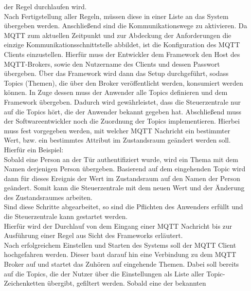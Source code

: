         der Regel durchlaufen wird.
        \\
        Nach Fertigstellung aller Regeln, müssen diese in einer Liste an das System übergeben werden. Anschließend sind die 
        Kommunikationswege zu aktivieren. 
        Da \acs{MQTT} zum aktuellen Zeitpunkt und zur Abdeckung der Anforderungen die einzige Kommunikationsschnittstelle 
        abbildet, ist die Konfiguration des \acs{MQTT} Clients einzustellen. Hierfür muss der Entwickler 
        dem Framework den Host des \acs{MQTT}-Brokers, sowie den Nutzername des Clients und dessen Passwort übergeben. Über das 
        Framework wird dann das Setup durchgeführt, sodass Topics (Themen), die über den Broker veröffentlicht werden, konsumiert 
        werden können. In Zuge dessen muss der Anwender alle Topics definieren und dem Framework übergeben. Dadurch wird gewährleistet, dass 
        die Steuerzentrale nur auf die Topics hört, die der Anwender bekannt gegeben hat. Abschließend muss der Softwareentwickler 
        noch die Zuordnung der Topics implementieren. Hierbei muss fest vorgegeben werden, mit welcher \acs{MQTT} Nachricht ein 
        bestimmter Wert, bzw. ein bestimmtes Attribut im Zustandsraum geändert werden soll. Hierfür ein Beispiel: 
        \\
        Sobald eine Person an der Tür authentifiziert wurde, wird ein Thema mit dem Namen derjenigen Person übergeben. Basierend auf 
        dem eingehenden Topic wird dann für dieses Ereignis der Wert im Zustandsraum auf den Namen der Person geändert. Somit kann 
        die Steuerzentrale mit dem neuen Wert und der Änderung des Zustandsraumes arbeiten.  
        \\
        \linebreak
        Sind diese Schritte abgearbeitet, so sind die Pflichten des Anwenders erfüllt und die Steuerzentrale kann gestartet werden. 
        \\
        Hierfür wird der Durchlauf von dem Eingang einer \acs{MQTT} Nachricht bis zur Ausführung einer Regel aus Sicht des Frameworks 
        erläutert.
        \\
        \linebreak
        Nach erfolgreichem Einstellen und Starten des Systems soll der \acs{MQTT} Client hochgefahren werden. Dieser baut darauf hin eine 
        Verbindung zu dem \acs{MQTT} Broker auf und startet das Zuhören auf eingehende Themen. Dabei soll bereits auf die Topics,  
        die der Nutzer über die Einstellungen als Liste aller Topic-Zeichenketten übergibt, gefiltert werden. Sobald eine der bekannten 
